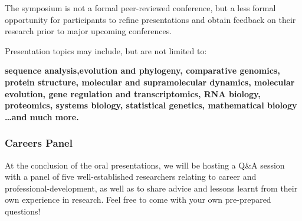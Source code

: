 \documentclass[10pt,]{article}
\begin{document}
The symposium is not a formal peer-reviewed conference, but a less formal
opportunity for participants to refine presentations and obtain feedback on
their research prior to major upcoming conferences.

Presentation topics may include, but are not limited to:\par\bigskip

\begin{minipage}[c]{\linewidth}
    \centering
    \begin{varwidth}[c]{0.8\linewidth}
        \raggedright
        \bfseries
        sequence analysis,evolution and phylogeny, comparative genomics, protein
        structure, molecular and supramolecular dynamics, molecular evolution, gene
        regulation and transcriptomics, RNA biology, proteomics, systems biology,
        statistical genetics, mathematical biology \normalfont\ldots and much more.
        \end{varwidth}
\end{minipage}\par\bigskip



\subsubsection{Careers Panel}

At the conclusion of the oral presentations, we will be hosting a Q\&A
session with a panel of five well-established researchers
relating to career and professional-development, as well as to share
advice and lessons learnt from their own experience in research. Feel free
to come with your own pre-prepared questions!\par\bigskip
\end{document}
